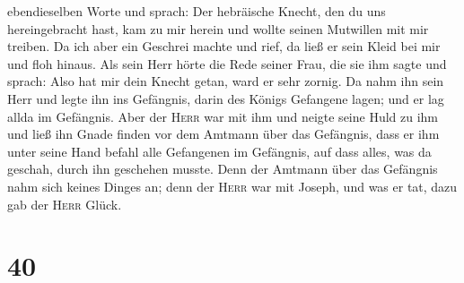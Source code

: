 ebendieselben Worte und sprach: Der hebräische Knecht, den du uns
hereingebracht hast, kam zu mir herein und wollte seinen Mutwillen mit
mir treiben.  Da ich aber ein Geschrei machte und rief,
da ließ er sein Kleid bei mir und floh hinaus.  Als sein
Herr hörte die Rede seiner Frau, die sie ihm sagte und sprach: Also hat
mir dein Knecht getan, ward er sehr zornig.  Da nahm ihn
sein Herr und legte ihn ins Gefängnis, darin des Königs Gefangene lagen;
und er lag allda im Gefängnis.  Aber der \textsc{Herr}
war mit ihm und neigte seine Huld zu ihm und ließ ihn Gnade finden vor
dem Amtmann über das Gefängnis,  dass er ihm unter seine
Hand befahl alle Gefangenen im Gefängnis, auf dass alles, was da
geschah, durch ihn geschehen musste.  Denn der Amtmann
über das Gefängnis nahm sich keines Dinges an; denn der \textsc{Herr}
war mit Joseph, und was er tat, dazu gab der \textsc{Herr} Glück.

\hypertarget{section-39}{%
\section{40}\label{section-39}}

